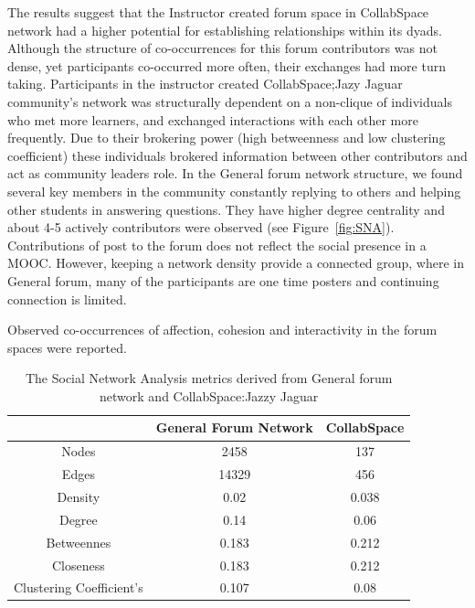\documentclass[manuscript,screen,review]{acmart}
\begin{document}
The results suggest that the Instructor created forum space in CollabSpace network had a higher potential for establishing relationships within its dyads. Although the structure of co-occurrences for this forum contributors was not dense, yet participants co-occurred more often, their exchanges had more turn taking. Participants in the instructor created CollabSpace;Jazy Jaguar community's network was structurally dependent on a non-clique of individuals who met more learners, and exchanged interactions with each other more frequently. Due to their brokering power (high betweenness and low clustering coefficient) these individuals brokered information between other contributors and act as community leaders role. In the General forum network structure, we found several key members in the community constantly replying to others and helping other students in answering questions. They have higher degree centrality and about 4-5 actively contributors were observed (see Figure~\ref{fig:SNA}). Contributions of post to the forum does not reflect the social presence in a MOOC. However, keeping a network density provide a connected group, where in General forum, many of the participants are one time posters and continuing connection is limited. 









Observed co-occurrences of affection, cohesion and interactivity in the forum spaces were reported. 

\begin{table}[h!]
\caption{The Social Network Analysis metrics derived from General forum network and CollabSpace:Jazzy Jaguar}
    \begin{tabular}{c|c|c}
    \toprule
     & General Forum Network  & CollabSpace  \\
     \midrule
     Nodes	& 2458 & 137    \\
     Edges & 14329 & 456   \\
     Density & 0.02 & 0.038  \\
     Degree & 0.14 & 0.06   \\ 
    Betweennes & 0.183 & 0.212 \\ 
    Closeness & 0.183 & 0.212  \\
    Clustering 
    Coefficient's & 0.107 & 0.08 \\
    \bottomrule
    \end{tabular}
    \end{table}
\end{document}
